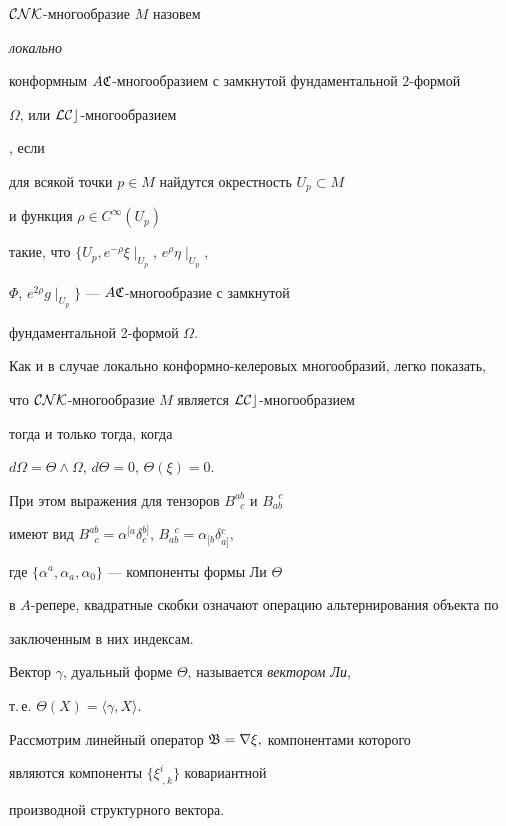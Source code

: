 \begin{defn} $\cal{CNK}$-многообразие $M$ назовем {\it локально 


конформным $A\frak C$-многообразием с замкнутой фундаментальной $2$-формой 


$\Omega$, или $\cal LCc$-многообразием}, если 


для всякой точки $p\in M$ найдутся окрестность $U_p \subset M$


и функция $\rho\in C^{\infty}(U_p)$ 


такие, что $\{U_p, e^{-\rho} \xi \mid_{U_p}$, $e^{\rho} \eta \mid_{U_p}$,


$\Phi$, $e^{2\rho}g \mid_{U_p} \}$ --- $A\frak C$-многообразие с замкнутой 


фундаментальной 2-формой $\Omega$. 


\end{defn}





Как и в случае локально конформно-келеровых многообразий, легко показать, 


что $\cal{CNK}$-многообразие $M$ является $\cal LCc$-многообразием


тогда и только тогда, когда 


$d\Omega{=}\Theta \wedge \Omega$, $d\Theta{=}0$, $\Theta(\xi)=0.$


При этом выражения для тензоров $B^{ab}_{\;\; c}$ и $B_{ab}^{\;\; c}$


имеют вид $B^{ab}_{\;\; c}=\alpha{}^{[a} 


\delta{}^{b]}_c$, $B_{ab}^{\;\; c}=\alpha{}_{[b} \delta{}_{a]}^c,$


где $\{ \alpha^a,\alpha_a,\alpha_0 \}$ --- компоненты формы Ли $\Theta$


в $A$-репере, квадратные скобки означают операцию альтернирования объекта по 


заключенным в них индексам.


Вектор $\gamma$, дуальный форме $\Theta$, называется {\it вектором Ли}, 


т.\,е. $\Theta (X)=\langle \gamma,X \rangle.$





Рассмотрим линейный оператор $\frak B=\nabla\xi,$ компонентами которого 


являются компоненты $\{ \xi^i_{\; ,k} \}$ ковариантной 


производной структурного вектора. 


